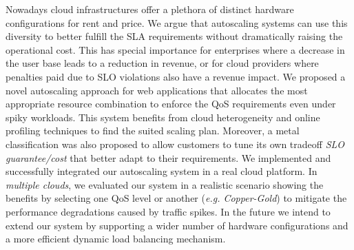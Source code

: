 
Nowadays cloud infrastructures offer a plethora of distinct hardware configurations for rent and price. We argue that autoscaling systems can use this diversity to better fulfill the SLA requirements without dramatically raising the operational cost. This has special importance for enterprises where a decrease in the user base leads to a reduction in revenue, or for cloud providers where penalties paid due to SLO violations also have a revenue impact. We proposed a novel autoscaling approach for web applications that allocates the most appropriate resource combination to enforce the QoS requirements even under spiky workloads. This system benefits from cloud heterogeneity and online profiling techniques to find the suited scaling plan. Moreover, a metal classification was also proposed to allow customers to tune its own tradeoff \emph{SLO guarantee/cost} that better adapt to their requirements. We implemented and successfully integrated our autoscaling system in a real cloud platform. In \emph{multiple clouds}, we evaluated our system in a realistic scenario showing the benefits by selecting one QoS level or another (\emph{e.g. Copper-Gold}) to mitigate the performance degradations caused by traffic spikes. In the future we intend to extend our system by supporting a wider number of hardware configurations and a more efficient dynamic load balancing mechanism. %









